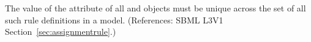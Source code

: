 The value of the  attribute of all \AssignmentRule and
\RateRule objects must be unique across the set of all such rule
definitions in a model.  (References: SBML L3V1
Section~\ref{sec:assignmentrule}.)
